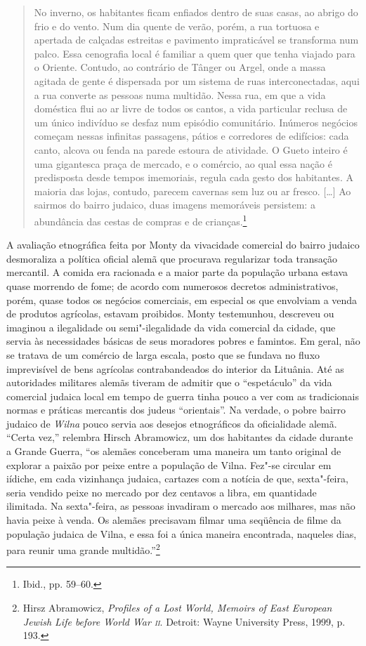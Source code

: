 \begin{quote}
No inverno, os habitantes ficam enfiados dentro de suas casas, ao abrigo
do frio e do vento. Num dia quente de verão, porém, a rua tortuosa e
apertada de calçadas estreitas e pavimento impraticável se transforma
num palco. Essa cenografia local é familiar a quem quer que tenha
viajado para o Oriente. Contudo, ao contrário de Tânger ou Argel, onde a
massa agitada de gente é dispersada por um sistema de ruas
interconectadas, aqui a rua converte as pessoas numa multidão. Nessa
rua, em que a vida doméstica flui ao ar livre de todos os cantos, a vida
particular reclusa de um único indivíduo se desfaz num episódio
comunitário. Inúmeros negócios começam nessas infinitas passagens,
pátios e corredores de edifícios: cada canto, alcova ou fenda na parede
estoura de atividade. O Gueto inteiro é uma gigantesca praça de mercado,
e o comércio, ao qual essa nação é predisposta desde tempos imemoriais,
regula cada gesto dos habitantes. A maioria das lojas, contudo, parecem
cavernas sem luz ou ar fresco. [\ldots{}] Ao sairmos do bairro judaico,
duas imagens memoráveis persistem: a abundância das cestas de compras e
de crianças.\footnote{Ibid., pp. 59--60.}
\end{quote}

A avaliação etnográfica feita por Monty da vivacidade comercial do
bairro judaico desmoraliza a política oficial alemã que procurava
regularizar toda transação mercantil. A comida era racionada e a maior
parte da população urbana estava quase morrendo de fome; de acordo com
numerosos decretos administrativos, porém, quase todos os negócios
comerciais, em especial os que envolviam a venda de produtos agrícolas,
estavam proibidos. Monty testemunhou, descreveu ou imaginou a
ilegalidade ou semi"-ilegalidade da vida comercial da cidade, que servia
às necessidades básicas de seus moradores pobres e famintos. Em geral,
não se tratava de um comércio de larga escala, posto que se fundava no
fluxo imprevisível de bens agrícolas contrabandeados do interior da
Lituânia. Até as autoridades militares alemãs tiveram de admitir que o
``espetáculo'' da vida comercial judaica local em tempo de guerra tinha
pouco a ver com as tradicionais normas e práticas mercantis dos judeus
``orientais''. Na verdade, o pobre bairro judaico de \textit{Wilna} pouco servia
aos desejos etnográficos da oficialidade alemã. ``Certa vez,'' relembra
Hirsch Abramowicz, um dos habitantes da cidade durante a Grande Guerra,
``os alemães conceberam uma maneira um tanto original de explorar a
paixão por peixe entre a população de Vilna. Fez"-se circular em iídiche,
em cada vizinhança judaica, cartazes com a notícia de que, sexta"-feira,
seria vendido peixe no mercado por dez centavos a libra, em quantidade
ilimitada. Na sexta"-feira, as pessoas invadiram o mercado aos milhares,
mas não havia peixe à venda. Os alemães precisavam filmar uma seqüência
de filme da população judaica de Vilna, e essa foi a única maneira
encontrada, naqueles dias, para reunir uma grande multidão.''\footnote{Hirsz Abramowicz, \textit{Profiles of a Lost World, Memoirs of East European Jewish Life before World War \textsc{ii}}. Detroit: Wayne University Press, 1999, p. 193.}

